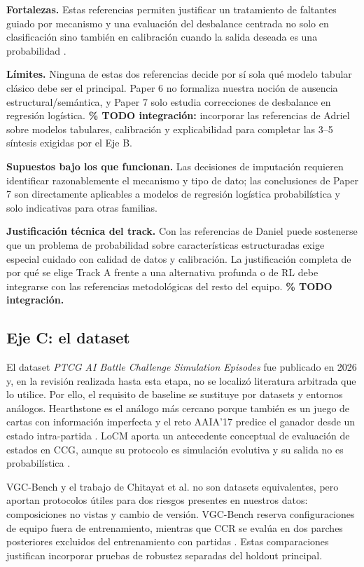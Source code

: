 \noindent\textbf{Fortalezas.} Estas referencias permiten justificar un
tratamiento de faltantes guiado por mecanismo y una evaluación del
desbalance centrada no solo en clasificación sino también en
calibración cuando la salida deseada es una probabilidad
\cite{emmanuel_missing_2021,vandenGoorbergh_imbalance_2022}.

\noindent\textbf{Límites.} Ninguna de estas dos referencias decide por
sí sola qué modelo tabular clásico debe ser el principal. Paper 6 no
formaliza nuestra noción de ausencia estructural/semántica, y Paper 7
solo estudia correcciones de desbalance en regresión logística.
\textbf{\% TODO integración:} incorporar las referencias de Adriel sobre
modelos tabulares, calibración y explicabilidad para completar las
3--5 síntesis exigidas por el Eje B.

\noindent\textbf{Supuestos bajo los que funcionan.} Las decisiones de
imputación requieren identificar razonablemente el mecanismo y tipo de
dato; las conclusiones de Paper 7 son directamente aplicables a modelos
de regresión logística probabilística y solo indicativas para otras
familias.

\noindent\textbf{Justificación técnica del track.} Con las referencias
de Daniel puede sostenerse que un problema de probabilidad sobre
características estructuradas exige especial cuidado con calidad de
datos y calibración. La justificación completa de por qué se elige
Track A frente a una alternativa profunda o de RL debe integrarse con
las referencias metodológicas del resto del equipo. \textbf{\% TODO
integración.}

\subsection{Eje C: el dataset}
\label{subsec:ejec}

El dataset \emph{PTCG AI Battle Challenge Simulation Episodes} fue
publicado en 2026 y, en la revisión realizada hasta esta etapa, no se
localizó literatura arbitrada que lo utilice. Por ello, el requisito de
baseline se sustituye por datasets y entornos análogos. Hearthstone es
el análogo más cercano porque también es un juego de cartas con
información imperfecta y el reto AAIA'17 predice el ganador desde un
estado intra-partida \cite{janusz_hearthstone_2017}. LoCM aporta un
antecedente conceptual de evaluación de estados en CCG, aunque su
protocolo es simulación evolutiva y su salida no es probabilística
\cite{miernik_evolving_2022}.

VGC-Bench y el trabajo de Chitayat et al. no son datasets equivalentes,
pero aportan protocolos útiles para dos riesgos presentes en nuestros
datos: composiciones no vistas y cambio de versión. VGC-Bench reserva
configuraciones de equipo fuera de entrenamiento, mientras que CCR se
evalúa en dos parches posteriores excluidos del entrenamiento con
partidas \cite{angliss_vgcbench_2026,chitayat_meta_2023}. Estas
comparaciones justifican incorporar pruebas de robustez separadas del
holdout principal.

